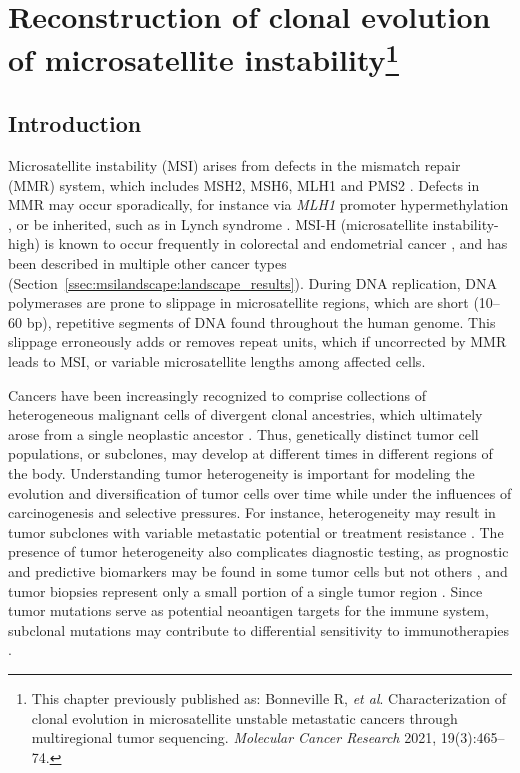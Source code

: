 \chapter[Reconstruction of clonal evolution of microsatellite instability]{Reconstruction of clonal evolution of microsatellite instability\footnote{This chapter previously published as: Bonneville R, \textit{et al}. Characterization of clonal evolution in microsatellite unstable metastatic cancers through multiregional tumor sequencing. \textit{Molecular Cancer Research} 2021, 19(3):465--74.}}
\label{ch:msiclones}

\section{Introduction}
Microsatellite instability (MSI) arises from defects in the mismatch repair (MMR) system, which includes MSH2, MSH6, MLH1 and PMS2 \cite{strand1993}. Defects in MMR may occur sporadically, for instance via \textit{MLH1} promoter hypermethylation \cite{kane1997}, or be inherited, such as in Lynch syndrome \cite{lynch1966}. MSI-H (microsatellite instability-high) is known to occur frequently in colorectal and endometrial cancer \cite{watson1994}, and has been described in multiple other cancer types \cite{bonneville2017} (Section~\ref{ssec:msilandscape:landscape_results}). During DNA replication, DNA polymerases are prone to slippage in microsatellite regions, which are short (10--60 bp), repetitive segments of DNA found throughout the human genome. This slippage erroneously adds or removes repeat units, which if uncorrected by MMR leads to MSI, or variable microsatellite lengths among affected cells.

Cancers have been increasingly recognized to comprise collections of heterogeneous malignant cells of divergent clonal ancestries, which ultimately arose from a single neoplastic ancestor \cite{gerlinger2012}. Thus, genetically distinct tumor cell populations, or subclones, may develop at different times in different regions of the body. Understanding tumor heterogeneity is important for modeling the evolution and diversification of tumor cells over time while under the influences of carcinogenesis and selective pressures. For instance, heterogeneity may result in tumor subclones with variable metastatic potential \cite{hong2015} or treatment resistance \cite{mcgranahan2017}. The presence of tumor heterogeneity also complicates diagnostic testing, as prognostic and predictive biomarkers may be found in some tumor cells but not others \cite{gerashchenko2013}, and tumor biopsies represent only a small portion of a single tumor region \cite{stanta2016}. Since tumor mutations serve as potential neoantigen targets for the immune system, subclonal mutations may contribute to differential sensitivity to immunotherapies \cite{lu2016}.

